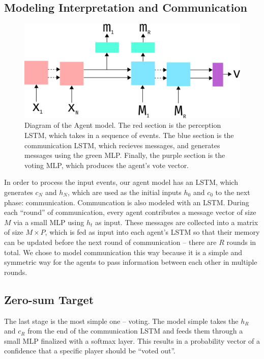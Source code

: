 \documentclass[10pt,twocolumn,letterpaper]{article}
\begin{document}
\subsection{Modeling Interpretation and Communication}
\begin{figure}
   \begin{center}
      \includegraphics[width=0.8 \textwidth]{img/model.png}
   \end{center}
      \caption{Diagram of the Agent model. The red section is the perception LSTM,
      which takes in a sequence of events. The blue section is the communication
      LSTM, which recieves messages, and generates messages using the green MLP.
      Finally, the purple section is the voting MLP, which produces the agent's
      vote vector.}
   \label{fig:model}
\end{figure}
In order to process the input events, our agent model has an LSTM, which
generates $c_N$ and $h_N$, which are used as the initial inputs
$h_0$ and $c_0$ to the next phase:
communication. Communcation is also modeled with an LSTM. During each ``round''
of communication, every agent contributes a message vector of size $M$ via
a small MLP using $h_t$ as input. These messages are collected into a matrix
of size $M \times P$, which is fed as input into each agent's LSTM so that
their memory can be updated before the next round of communication -- there
are $R$ rounds in total. We chose
to model communication this way because it is a simple and symmetric way for the agents
to pass information between each other in multiple rounds.
   
\subsection{Zero-sum Target}
The last stage is the most simple one -- voting. The model simple takes the $h_R$ and
$c_R$ from the end of the communication LSTM and feeds them through
a small MLP finalized with a softmax layer. This results in a probability vector
of a confidence that a specific player should be ``voted out''.
\end{document}
